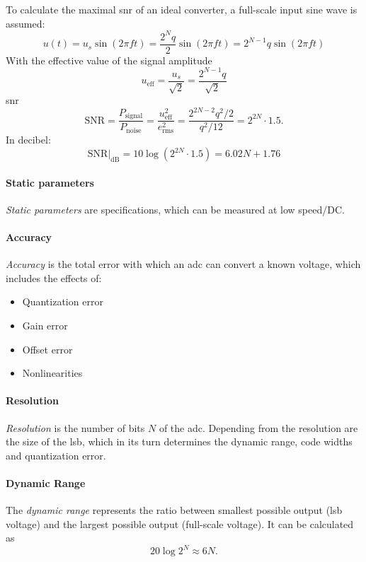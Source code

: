 To calculate the maximal \gls{snr} of an ideal converter, a full-scale input sine wave is assumed:
\begin{equation}
u(t) = u_s \sin(2\pi f t) = \frac{2^{N}q}{2}\sin(2\pi f t)  = 2^{N-1}q \sin(2\pi f t)
\end{equation}
With the effective value of the signal amplitude
\begin{equation}
u_{\text{eff}} = \frac{u_s}{\sqrt{2}} = \frac{2^{N-1}q}{\sqrt{2}}
\end{equation}
\gls{snr}
\begin{equation}
\text{SNR} = \frac{P_{\text{signal}}}{P_{\text{noise}}} = \frac{u_{\text{eff}}^{2}}{e_{\text{rms}}^{2}} = \frac{2^{2N-2}q^2/2}{q^2/12} = 2^{2N} \cdot 1.5.
\end{equation}
In decibel:
\begin{equation}\label{eq:idealSNR}
\text{SNR}|_{\text{dB}} = 10\log\left(2^{2N}\cdot 1.5\right) = 6.02 N + 1.76
\end{equation}
\cite{puente2015} \cite{walt}



\paragraph{Static parameters}
\textit{Static parameters} are specifications, which can be measured at low speed/DC. 
\paragraph{Accuracy}
\textit{Accuracy} is the total error with which an \gls{adc} can convert a known voltage, which includes the effects of:
\begin{itemize}[noitemsep]
	\item Quantization error
	\item Gain error
	\item Offset error
	\item Nonlinearities
\end{itemize}
\cite{Lundberg}
\paragraph{Resolution}
\textit{Resolution} is the number of bits $N$ of the \gls{adc}.
Depending from the resolution are the size of the \gls{lsb}, which in its turn determines the dynamic range, code widths and quantization error.
\paragraph{Dynamic Range}
The \textit{dynamic range} represents the ratio between smallest possible output (\gls{lsb} voltage) and the largest possible output (full-scale voltage).
It can be calculated as
\begin{equation}
	20 \log 2^{N} \approx 6N.
\end{equation}

